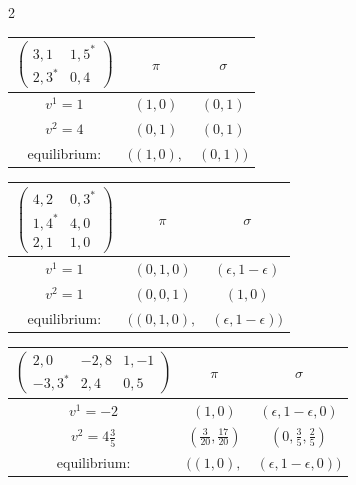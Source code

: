 \documentclass[12pt]{article}
\begin{document}
\begin{multicols}{2}
    \begin{center}
        \begin{tabular}{c|c c}
            $\begin{pmatrix}
                3, 1 & 1, 5^\ast \\
                2, 3^\ast & 0, 4
            \end{pmatrix}$ & $\pi$ & $\sigma$ \\ \hline
            $v^1 = 1$ & $(1, 0)$ & $(0, 1)$ \\
            $v^2 = 4$ & $(0, 1)$ & $(0, 1)$ \\
            equilibrium: & $((1, 0),$ & $(0, 1))$
        \end{tabular}
    \end{center}

    \begin{center}
        \begin{tabular}{c|c c}
            $\begin{pmatrix}
                4, 2 & 0, 3^\ast \\
                1, 4^\ast & 4, 0 \\
                2, 1 & 1, 0
            \end{pmatrix}$ & $\pi$ & $\sigma$ \\ \hline
            $v^1 = 1$ & $(0, 1, 0)$ & $(\epsilon, 1 - \epsilon)$ \\
            $v^2 = 1$ & $(0, 0, 1)$ & $(1, 0)$ \\
            equilibrium: & $((0, 1, 0),$ & $(\epsilon, 1 - \epsilon))$
        \end{tabular}
    \end{center}
\end{multicols}

\begin{center}
    \begin{tabular}{c|c c}
        $\begin{pmatrix}
            2, 0 & -2, 8 & 1, -1 \\
            -3, 3^\ast & 2, 4 & 0, 5
        \end{pmatrix}$ & $\pi$ & $\sigma$ \\ \hline
        $v^1 = -2$ & $(1, 0)$ & $(\epsilon, 1 - \epsilon, 0)$ \\
        $v^2 = 4\frac{3}{5}$ & $(\frac{3}{20}, \frac{17}{20})$ & $(0, \frac{3}{5}, \frac{2}{5})$ \\
        equilibrium: & $((1, 0),$ & $(\epsilon, 1 - \epsilon, 0))$
    \end{tabular}
\end{center}
\end{document}
